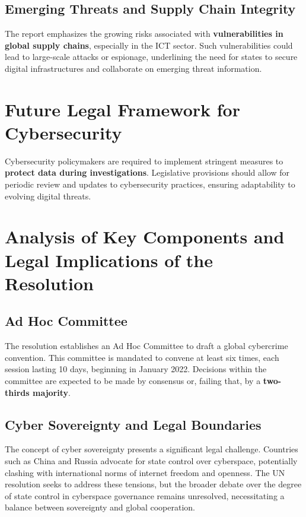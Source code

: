 \subsection{Emerging Threats and Supply Chain Integrity}
The report emphasizes the growing risks associated with
\textbf{vulnerabilities in global supply chains}, especially in the
ICT sector. Such vulnerabilities could lead to large-scale attacks or
espionage, underlining the need for states to secure digital
infrastructures and collaborate on emerging threat information.

\section{Future Legal Framework for Cybersecurity}
Cybersecurity policymakers are required to implement stringent
measures to \textbf{protect data during investigations}. Legislative
provisions should allow for periodic review and updates to
cybersecurity practices, ensuring adaptability to evolving digital
threats.

\section{Analysis of Key Components and Legal Implications of the
Resolution}

\subsection{Ad Hoc Committee}
The resolution establishes an Ad Hoc Committee to draft a global
cybercrime convention. This committee is mandated to convene at least
six times, each session lasting 10 days, beginning in January 2022.
Decisions within the committee are expected to be made by consensus
or, failing that, by a \textbf{two-thirds majority}.

\subsection{Cyber Sovereignty and Legal Boundaries}
The concept of cyber sovereignty presents a significant legal
challenge. Countries such as China and Russia advocate for state
control over cyberspace, potentially clashing with international norms
of internet freedom and openness. The UN resolution seeks to address
these tensions, but the broader debate over the degree of state
control in cyberspace governance remains unresolved, necessitating a
balance between sovereignty and global cooperation.

